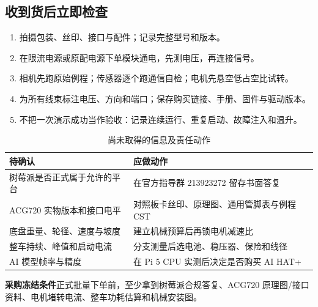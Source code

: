 \documentclass[UTF8,a4paper,zihao=-4,fontset=fandol]{ctexart}
\newcommand{\note}[2]{\par\smallskip\noindent\colorbox{Pale}{\parbox{\dimexpr\linewidth-2\fboxsep\relax}{\small\textbf{\color{Teal}#1}\quad #2}}\par\smallskip}
\begin{document}
\subsection{收到货后立即检查}

\begin{enumerate}
\item 拍摄包装、丝印、接口与配件；记录完整型号和版本。
\item 在限流电源或原配电源下单模块通电，先测电压，再连接信号。
\item 相机先跑原始例程；传感器逐个跑通信自检；电机先悬空低占空比试转。
\item 为所有线束标注电压、方向和端口；保存购买链接、手册、固件与驱动版本。
\item 不把一次演示成功当作验收：记录连续运行、重复启动、故障注入和温升。
\end{enumerate}

\begin{table}[H]\small
\caption{尚未取得的信息及责任动作}\label{tab:unknown}
\begin{tabularx}{\linewidth}{@{}L{4.2cm}Y@{}}\toprule
\textbf{待确认} & \textbf{应做动作}\\\midrule
树莓派是否正式属于允许的平台 & 在官方指导群 213923272 留存书面答复\\
ACG720 实物版本和接口电平 & 对照板卡丝印、原理图、通用管脚表与例程 CST\\
底盘重量、轮径、速度与坡度 & 建立机械预算后再锁电机减速比\\
整车持续、峰值和启动电流 & 分支测量后选电池、稳压器、保险和线径\\
AI 模型帧率与精度 & 在 Pi 5 CPU 实测后决定是否购买 AI HAT+\\\bottomrule
\end{tabularx}
\end{table}

\note{采购冻结条件}{正式批量下单前，至少拿到树莓派合规答复、ACG720 原理图/接口资料、电机堵转电流、整车功耗估算和机械安装图。}
\end{document}
